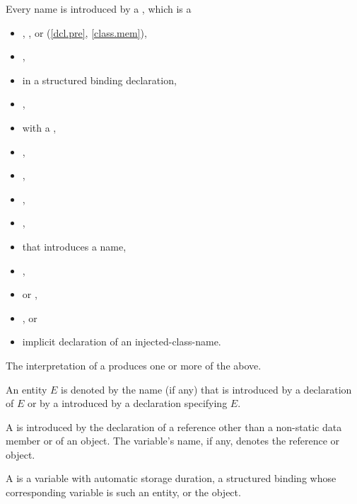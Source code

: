 \pnum
Every name is introduced by a , which is a
\begin{itemize}
\item
{},
, or
 (\ref{dcl.pre}, \ref{class.mem}),
\item
{},
\item
{}
in a structured binding declaration,
\item
{},
\item
{} with a ,
\item
{},
\item
{},
\item
{},
\item
{},
\item
{}
that introduces a name,
\item
{},
\item
{} or
,
\item
{}, or
\item
implicit declaration of an injected-class-name.
\end{itemize}
\begin{note}
The interpretation of a  produces
one or more of the above.
\end{note}
An entity $E$ is denoted by the name (if any)
that is introduced by a declaration of $E$ or
by a  introduced by a declaration specifying $E$.

\pnum
A  is introduced by the
declaration of
a reference other than a non-static data member or of
an object. The variable's name, if any, denotes the reference or object.

\pnum
A  is a variable with
automatic storage duration,
a structured binding
whose corresponding variable is such an entity,
or the  object.

